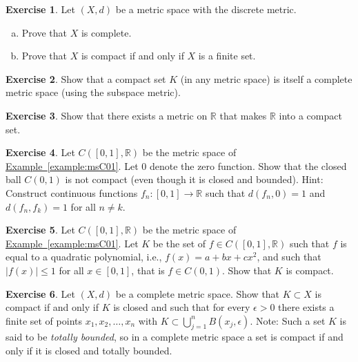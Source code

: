 \documentclass[12pt,openany]{book}
\newcommand{\abs}[1]{\left\lvert {#1} \right\rvert}
\newcommand{\R}{{\mathbb{R}}}
\newcommand{\myindex}[1]{#1\index{#1}}
\theoremstyle{plain}
\theoremstyle{remark}
\theoremstyle{definition}
\newenvironment{exbox}{%
    \def\FrameCommand{\vrule width 1pt \relax\hspace{10pt}}%
    \MakeFramed{\advance\hsize-\width\FrameRestore}%
}{%
    \endMakeFramed
}
\newenvironment{exparts}{%
    \leavevmode\begin{enumerate}[a),noitemsep,topsep=0pt,parsep=0pt,partopsep=0pt]
}{%
    \end{enumerate}
}
\theoremstyle{exercise}
\newtheorem{exercise}{Exercise}[section]
\theoremstyle{example}
\newcommand{\exampleref}[1]{\hyperref[#1]{Example~\ref*{#1}}}
\begin{document}
\begin{exbox}
\begin{exercise}
Let $(X,d)$ be a metric space with the discrete metric.
\begin{exparts}
\item
Prove that $X$ is complete.
\item
Prove that $X$ is compact if and only if $X$ is a finite set.
\end{exparts}
\end{exercise}

\begin{exercise}
Show that a compact set $K$ (in any metric space)
is itself a complete metric space (using the subspace metric).
\end{exercise}

\begin{exercise}
Show that there exists a metric on $\R$ that makes $\R$ into a compact set.
\end{exercise}

\begin{exercise} \label{exercise:msclbounnotcompt}
Let $C([0,1],\R)$ be the metric space of \exampleref{example:msC01}.  Let $0$
denote the zero function.  Show that the closed ball
$C(0,1)$ is not compact (even though it is closed and bounded).
Hint: Construct continuous functions $f_n \colon [0,1] \to \R$ such that
$d(f_n,0) = 1$ and $d(f_n,f_k) = 1$ for all $n \neq k$.
\end{exercise}

\begin{exercise}
Let $C([0,1],\R)$ be the metric space of \exampleref{example:msC01}.
Let $K$ be the set of $f \in C([0,1],\R)$ such that
$f$ is equal to a quadratic polynomial, i.e., $f(x) = a+bx+cx^2$, and such that
$\abs{f(x)} \leq 1$ for all $x \in [0,1]$,
that is $f \in C(0,1)$.  Show that $K$ is compact.
\end{exercise}

\begin{exercise} \label{exercise:mstotbound}
Let $(X,d)$ be a complete metric space.
Show that $K \subset X$ is compact if and only if $K$ is closed
and such that for every $\epsilon > 0$
there exists a finite set of points $x_1,x_2,\ldots,x_n$ with
$K \subset \bigcup_{j=1}^n B(x_j,\epsilon)$.
Note: Such a set $K$ is said to be \emph{\myindex{totally bounded}},
so in a complete metric space a set is compact if and only
if it is closed and totally bounded.
\end{exercise}


\end{exbox}
\end{document}
